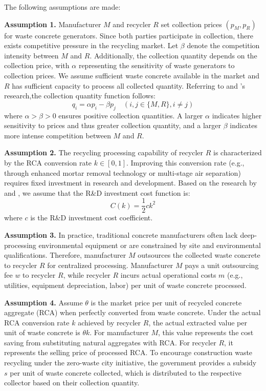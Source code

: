 \documentclass[authoryear,preprint,review,times,10pt]{elsarticle}
\begin{document}
The following assumptions are made:

\textbf{Assumption 1.} Manufacturer $M$ and recycler $R$ set collection prices $(p_M, p_R)$ for waste concrete generators. Since both parties participate in collection, there exists competitive pressure in the recycling market. Let $\beta$ denote the competition intensity between $M$ and $R$. Additionally, the collection quantity depends on the collection price, with $\alpha$ representing the sensitivity of waste generators to collection prices. We assume sufficient waste concrete available in the market and $R$ has sufficient capacity to process all collected quantity. Referring to \citep{chen2025Lowcarbon} and \citep{zhang2024Selection}'s research,the collection quantity function follows:
\begin{equation}
q_i = \alpha p_i - \beta p_j \quad (i,j \in \{M, R\}, i \neq j)
\end{equation}
where $\alpha > \beta > 0$ ensures positive collection quantities. A larger $\alpha$ indicates higher sensitivity to prices and thus greater collection quantity, and a larger $\beta$ indicates more intense competition between $M$ and $R$.

\textbf{Assumption 2.} The recycling processing capability of recycler $R$ is characterized by the RCA conversion rate $k \in [0,1]$. Improving this conversion rate (e.g., through enhanced mortar removal technology or multi-stage air separation) requires fixed investment in research and development. Based on the research by \cite{jones2011Information} and \cite{chen2024Risk}, we assume that the R\&D investment cost function is:
\begin{equation}
C(k) = \frac{1}{2} c k^2
\end{equation}
where $c$ is the R\&D investment cost coefficient.

\textbf{Assumption 3.} In practice, traditional concrete manufacturers often lack deep-processing environmental equipment or are constrained by site and environmental qualifications. Therefore, manufacturer $M$ outsources the collected waste concrete to recycler $R$ for centralized processing. Manufacturer $M$ pays a unit outsourcing fee $w$ to recycler $R$, while recycler $R$ incurs actual operational costs $m$ (e.g., utilities, equipment depreciation, labor) per unit of waste concrete processed.

\textbf{Assumption 4.} Assume $\theta$ is the market price per unit of recycled concrete aggregate (RCA) when perfectly converted from waste concrete. Under the actual RCA conversion rate $k$ achieved by recycler $R$, the actual extracted value per unit of waste concrete is $\theta k$. For manufacturer $M$, this value represents the cost saving from substituting natural aggregates with RCA. For recycler $R$, it represents the selling price of processed RCA. To encourage construction waste recycling under the zero-waste city initiative, the government provides a subsidy $s$ per unit of waste concrete collected, which is distributed to the respective collector based on their collection quantity.
\end{document}

